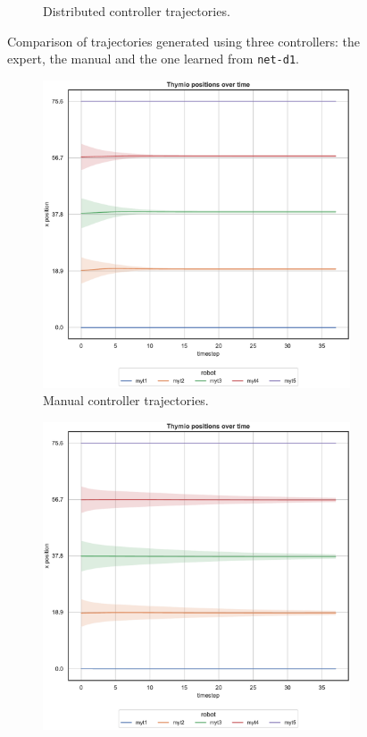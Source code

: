 \begin{figure}[!htb]
\begin{center}
\begin{subfigure}[h]{0.49\textwidth}
			\caption{Distributed controller trajectories.}
		\end{subfigure}
	\end{center}
	\caption[Evaluation of the trajectories learned by \texttt{net-d1}.]{Comparison 
		of trajectories generated using three controllers: the expert, the manual and 
		the one learned from \texttt{net-d1}.}
\end{figure}

\begin{figure}\ContinuedFloat
	\begin{center}
		\begin{subfigure}[h]{0.49\textwidth}
			\centering
			\includegraphics[width=.9\textwidth]{contents/images/net-d1/position-overtime-manual}%
			\caption{Manual controller trajectories.}
		\end{subfigure}
		\hfill
		\begin{subfigure}[h]{0.49\textwidth}
			\centering
			\includegraphics[width=.9\textwidth]{contents/images/net-d1/position-overtime-learned_distributed}

\end{subfigure}
\end{center}
\end{figure}
